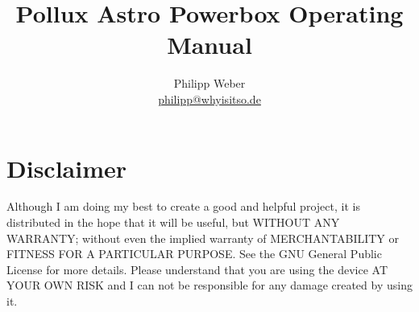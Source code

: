 \documentclass{scrartcl}
\title{Pollux Astro Powerbox Operating Manual}
\author{Philipp Weber \\
  \footnotesize{\href{mailto:philipp@whyisitso.dep}{philipp@whyisitso.de}}
}
\begin{document}
\maketitle
\newpage

\tableofcontents
\newpage

\section{Disclaimer}
Although I am doing my best to create a good and helpful project, it is
distributed in the hope that it will be useful, but WITHOUT ANY WARRANTY;
without even the implied warranty of MERCHANTABILITY or FITNESS FOR A PARTICULAR
PURPOSE. See the GNU General Public License for more details. Please understand
that you are using the device AT YOUR OWN RISK and I can not be responsible for
any damage created by using it.
\end{document}
